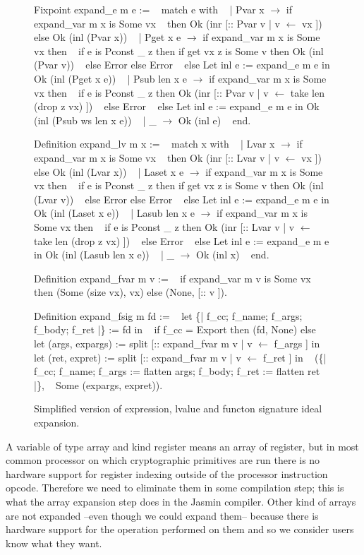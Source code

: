 \documentclass{article}
\begin{document}
\begin{figure}[p]
\obeylines\obeyspaces\ttfamily%
Fixpoint expand\_e m e := 
~ match e with
~ | Pvar x \(\rightarrow\) if expand\_var m x is Some vx
~   then Ok (inr [:: Pvar v | v \(\leftarrow\) vx ]) else Ok (inl (Pvar x))
~ | Pget x e \(\rightarrow\) if expand\_var m x is Some vx then
~     if e is Pconst \_ z then if get vx z is Some v then Ok (inl (Pvar v))
~     else Error else Error
~   else Let inl e := expand\_e m e in Ok (inl (Pget x e))
~ | Psub len x e \(\rightarrow\) if expand\_var m x is Some vx then
~     if e is Pconst \_ z then Ok (inr [:: Pvar v | v \(\leftarrow\) take len (drop z vx) ])
~     else Error
~   else Let inl e := expand\_e m e in Ok (inl (Psub ws len x e))
~ | \_ \(\rightarrow\) Ok (inl e)
~ end.

Definition expand\_lv m x :=
~ match x with
~ | Lvar x \(\rightarrow\) if expand\_var m x is Some vx
~   then Ok (inr [:: Lvar v | v \(\leftarrow\) vx ]) else Ok (inl (Lvar x))
~ | Laset x e \(\rightarrow\) if expand\_var m x is Some vx then
~     if e is Pconst \_ z then if get vx z is Some v then Ok (inl (Lvar v))
~     else Error else Error
~   else Let inl e := expand\_e m e in Ok (inl (Laset x e))
~ | Lasub len x e \(\rightarrow\) if expand\_var m x is Some vx then
~     if e is Pconst \_ z then Ok (inr [:: Lvar v | v \(\leftarrow\) take len (drop z vx) ])
~     else Error
~   else Let inl e := expand\_e m e in Ok (inl (Lasub len x e))
~ | \_ \(\rightarrow\) Ok (inl x)
~ end.

Definition expand\_fvar m v :=
~ if expand\_var m v is Some vx then (Some (size vx), vx) else (None, [:: v ]).

Definition expand\_fsig m fd :=
~ let \{| f\_cc; f\_name; f\_args; f\_body; f\_ret |\} := fd in
~ if f\_cc = Export then (fd, None) else
~ let (args, expargs) := split [:: expand\_fvar m v | v \(\leftarrow\) f\_args ] in
~ let (ret,  expret)  := split [:: expand\_fvar m v | v \(\leftarrow\) f\_ret  ] in
~ (\{| f\_cc; f\_name; f\_args := flatten args; f\_body; f\_ret := flatten ret |\},
~   Some (expargs, expret)).
\normalfont%
\caption{Simplified version of expression, lvalue and functon signature ideal expansion.}
\end{figure}

A variable of type array and kind register means an array of register, but in
most common processor on which cryptographic primitives are run there is no
hardware support for register indexing outside of the processor instruction
opcode. Therefore we need to eliminate them in some compilation step; this is
what the array expansion step does in the Jasmin compiler. Other kind of arrays
are not expanded --even though we could expand them-- because there is hardware
support for the operation performed on them and so we consider users know what
they want.
\end{document}
